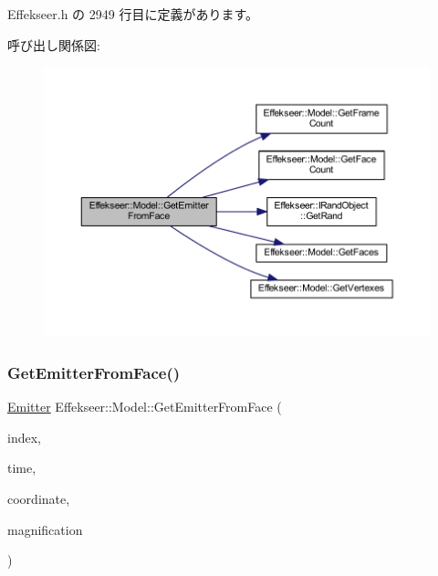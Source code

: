  Effekseer.\+h の 2949 行目に定義があります。

呼び出し関係図\+:\nopagebreak
\begin{figure}[H]
\begin{center}
\leavevmode
\includegraphics[width=350pt]{class_effekseer_1_1_model_aef7548be4adad150a7f573ac977d89c7_cgraph}
\end{center}
\end{figure}
\mbox{\label{class_effekseer_1_1_model_a1bd509af3054aeee73aaf495732e3f4a}} 
\subsubsection{\texorpdfstring{Get\+Emitter\+From\+Face()}{GetEmitterFromFace()}\hspace{0.1cm}{\footnotesize\ttfamily [2/2]}}
{\footnotesize\ttfamily \mbox{\hyperlink{struct_effekseer_1_1_model_1_1_emitter}{Emitter}} Effekseer\+::\+Model\+::\+Get\+Emitter\+From\+Face (\begin{DoxyParamCaption}\item[{int32\+\_\+t}]{index,  }\item[{int32\+\_\+t}]{time,  }\item[{\mbox{\hyperlink{namespace_effekseer_ac8508f8823c5fcf36aac5d2ddee23765}{Coordinate\+System}}}]{coordinate,  }\item[{float}]{magnification }\end{DoxyParamCaption})\hspace{0.3cm}{\ttfamily [inline]}}



